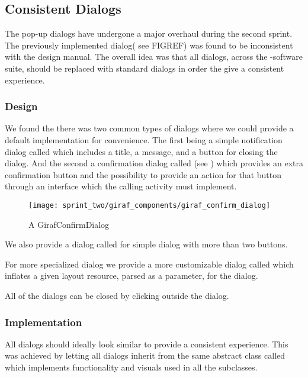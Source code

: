 \subsection{Consistent Dialogs}
\label{sec:consistent_dialogs}

The pop-up dialogs have undergone a major overhaul during the second sprint. The previously implemented dialog( see FIGREF) was found to be inconsistent with the \giraf design manual. The overall idea was that all dialogs, across the \giraf-software suite, should be replaced with standard dialogs in order the give a consistent experience. 

\subsubsection{Design}

We found the there was two common types of dialogs where we could provide a default implementation for convenience. The first being a simple notification dialog called  which includes a title, a message, and a button for closing the dialog. And the second a confirmation dialog called  (see ) which provides an extra confirmation button and the possibility to provide an action for that button through an interface which the calling activity must implement. 

\begin{figure}[!htbp]
    \centering
    \texttt{[image: sprint\_two/giraf\_components/giraf\_confirm\_dialog]}
    \caption{A GirafConfirmDialog}
    \label{fig:giraf_confirm_dialog}
\end{figure}

We also provide a dialog called  for simple dialog with more than two buttons.

For more specialized dialog we provide a more customizable dialog called  which inflates a given layout resource, parsed as a parameter, for the dialog.

All of the dialogs can be closed by clicking outside the dialog.

\subsubsection{Implementation}

All dialogs should ideally look similar to provide a consistent experience. This was achieved by letting all dialogs inherit from the same abstract class called  which implements functionality and visuals used in all the subclasses.

